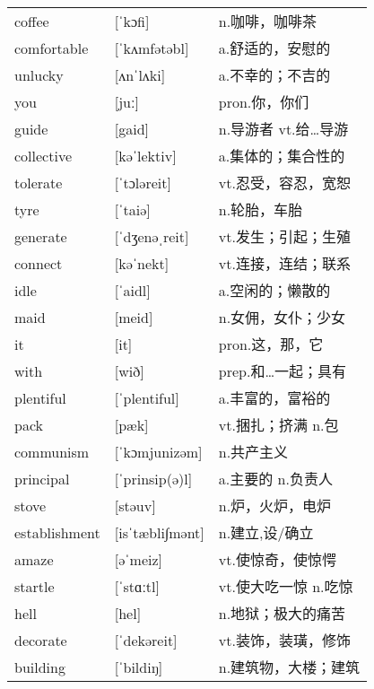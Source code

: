\documentclass[a4paper]{article}
\begin{document}
\section{}
\begin{tabular}{l l l}

coffee & [ˈkɔfi] & n.咖啡，咖啡茶 \\
comfortable & [ˈkʌmfətəbl] & a.舒适的，安慰的 \\
unlucky & [ʌnˈlʌki] & a.不幸的；不吉的 \\
you & [juː] & pron.你，你们 \\
guide & [gaid] & n.导游者 vt.给…导游 \\
collective & [kəˈlektiv] & a.集体的；集合性的 \\
tolerate & [ˈtɔləreit] & vt.忍受，容忍，宽恕 \\
tyre & [ˈtaiə] & n.轮胎，车胎 \\
generate & [ˈdʒenəˌreit] & vt.发生；引起；生殖 \\
connect & [kəˈnekt] & vt.连接，连结；联系 \\
idle & [ˈaidl] & a.空闲的；懒散的 \\
maid & [meid] & n.女佣，女仆；少女 \\
it & [it] & pron.这，那，它 \\
with & [wið] & prep.和…一起；具有 \\
plentiful & [ˈplentiful] & a.丰富的，富裕的 \\
pack & [pæk] & vt.捆扎；挤满 n.包 \\
communism & [ˈkɔmjunizəm] & n.共产主义 \\
principal & [ˈprinsip(ə)l] & a.主要的 n.负责人 \\
stove & [stəuv] & n.炉，火炉，电炉 \\
establishment & [isˈtæbli∫mənt] & n.建立,设/确立 \\
amaze & [əˈmeiz] & vt.使惊奇，使惊愕 \\
startle & [ˈstɑːtl] & vt.使大吃一惊 n.吃惊 \\
hell & [hel] & n.地狱；极大的痛苦 \\
decorate & [ˈdekəreit] & vt.装饰，装璜，修饰 \\
building & [ˈbildiŋ] & n.建筑物，大楼；建筑 \\

\end{tabular}
\end{document}

